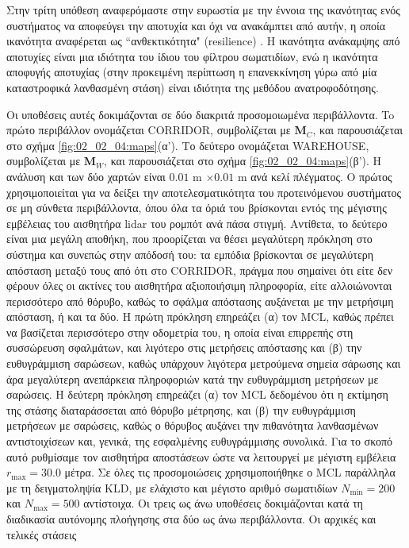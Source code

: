 Στην τρίτη υπόθεση αναφερόμαστε στην ευρωστία με την έννοια της ικανότητας ενός
συστήματος να αποφεύγει την αποτυχία και όχι να ανακάμπτει από αυτήν, η οποία
ικανότητα αναφέρεται ως ``ανθεκτικότητα" (resilience)
\cite{Zhu2011b,Tavana2011}. Η ικανότητα ανάκαμψης από αποτυχίες είναι μια
ιδιότητα του ίδιου του φίλτρου σωματιδίων, ενώ η ικανότητα αποφυγής αποτυχίας
(στην προκειμένη περίπτωση η επανεκκίνηση γύρω από μία καταστροφικά λανθασμένη
στάση) είναι ιδιότητα της μεθόδου ανατροφοδότησης.

Οι υποθέσεις αυτές δοκιμάζονται σε δύο διακριτά προσομοιωμένα περιβάλλοντα. To
πρώτο περιβάλλον ονομάζεται CORRIDOR, συμβολίζεται με $\bm{M}_C$, και
παρουσιάζεται στο σχήμα \ref{fig:02_02_04:maps}(α'). Το δεύτερο ονομάζεται
WAREHOUSE, συμβολίζεται με $\bm{M}_W$, και παρουσιάζεται στο σχήμα
\ref{fig:02_02_04:maps}(β'). Η ανάλυση και των δύο χαρτών είναι $0.01$ m
$\times0.01$ m ανά κελί πλέγματος. Ο πρώτος χρησιμοποιείται για να δείξει την
αποτελεσματικότητα του προτεινόμενου συστήματος σε μη σύνθετα περιβάλλοντα,
όπου όλα τα όριά του βρίσκονται εντός της μέγιστης εμβέλειας του αισθητήρα
lidar του ρομπότ ανά πάσα στιγμή.  Αντίθετα, το δεύτερο είναι μια μεγάλη
αποθήκη, που προορίζεται να θέσει μεγαλύτερη πρόκληση στο σύστημα και συνεπώς
στην απόδοσή του: τα εμπόδια βρίσκονται σε μεγαλύτερη απόσταση μεταξύ τους από
ότι στο CORRIDOR, πράγμα που σημαίνει ότι είτε δεν φέρουν όλες οι ακτίνες του
αισθητήρα αξιοποιήσιμη πληροφορία, είτε αλλοιώνονται περισσότερο από θόρυβο,
καθώς το σφάλμα απόστασης αυξάνεται με την μετρήσιμη απόσταση, ή και τα δύο. Η
πρώτη πρόκληση επηρεάζει (α) τον MCL, καθώς πρέπει να βασίζεται περισσότερο
στην οδομετρία του, η οποία είναι επιρρεπής στη συσσώρευση σφαλμάτων, και
λιγότερο στις μετρήσεις απόστασης και (β) την ευθυγράμμιση σαρώσεων, καθώς
υπάρχουν λιγότερα μετρούμενα σημεία σάρωσης και άρα μεγαλύτερη ανεπάρκεια
πληροφοριών κατά την ευθυγράμμιση μετρήσεων με σαρώσεις. Η δεύτερη πρόκληση
επηρεάζει (α) τον MCL δεδομένου ότι η εκτίμηση της στάσης διαταράσσεται από
θόρυβο μέτρησης, και (β) την ευθυγράμμιση μετρήσεων με σαρώσεις, καθώς ο
θόρυβος αυξάνει την πιθανότητα λανθασμένων αντιστοιχίσεων και, γενικά, της
εσφαλμένης ευθυγράμμισης συνολικά. Για το σκοπό αυτό ρυθμίσαμε τον αισθητήρα
αποστάσεων ώστε να λειτουργεί με μέγιστη εμβέλεια $r_{\max} = 30.0$ μέτρα.  Σε
όλες τις προσομοιώσεις χρησιμοποιήθηκε ο MCL παράλληλα με τη δειγματοληψία KLD,
με ελάχιστο και μέγιστο αριθμό σωματιδίων $N_{\min}=200$ και $N_{\max}=500$
αντίστοιχα.  Οι τρεις ως άνω υποθέσεις δοκιμάζονται κατά τη διαδικασία
αυτόνομης πλοήγησης στα δύο ως άνω περιβάλλοντα. Οι αρχικές και τελικές στάσεις
